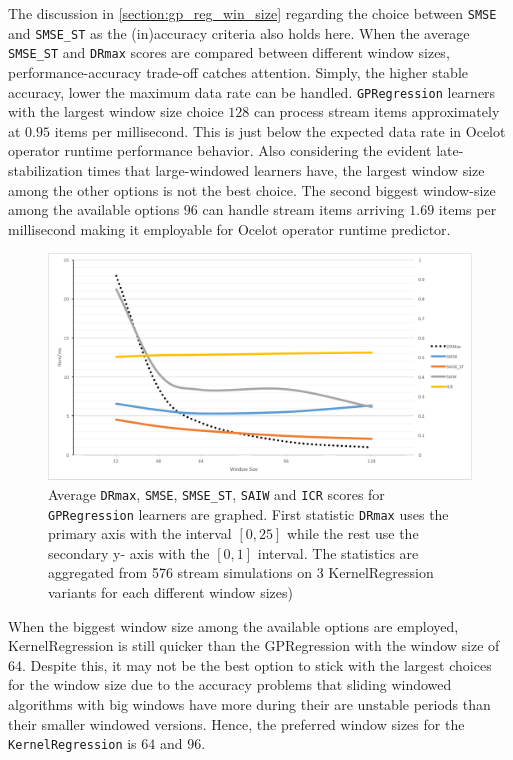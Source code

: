 The discussion in \ref{section:gp_reg_win_size} regarding the choice between \texttt{SMSE} and \texttt{SMSE\_ST} as the (in)accuracy criteria also holds here. When the average \texttt{SMSE\_ST} and \texttt{DRmax} scores are compared between different window sizes, performance-accuracy trade-off catches attention. Simply, the higher stable accuracy, lower the maximum data rate can be handled. \texttt{GPRegression} learners with the largest window size choice $128$ can process stream items approximately at $0.95$ items per millisecond. This is just below the expected data rate in Ocelot operator runtime performance behavior. Also considering the evident late-stabilization times that large-windowed learners have, the largest window size among the other options is not the best choice. The second biggest window-size among the available options $96$ can handle stream items arriving $1.69$ items per millisecond making it employable for Ocelot operator runtime predictor.
\begin{figure}[htbp]
  \centering
    \includegraphics[width=\linewidth]{./Figures/kreg_wsize_sweet_pt.pdf}
  \caption{Average \texttt{DRmax}, \texttt{SMSE}, \texttt{SMSE\_ST}, \texttt{SAIW} and \texttt{ICR} scores for \texttt{GPRegression} learners are graphed. First statistic \texttt{DRmax} uses the primary axis with the interval $[0,25]$ while the rest use the secondary y- axis with the $[0,1]$ interval. The statistics are aggregated from 576 stream simulations on 3 KernelRegression variants for each different window sizes)}
  \label{fig:kreg_wsize_sweet_pt}
\end{figure}

When the biggest window size among the available options are employed, KernelRegression is still quicker than the GPRegression with the window size of $64$. Despite this, it may not be the best option to stick with the largest choices for the window size due to the accuracy problems that sliding windowed algorithms with big windows have more during their are unstable periods than their smaller windowed versions. Hence, the preferred window sizes for the \texttt{KernelRegression} is $64$ and $96$.

